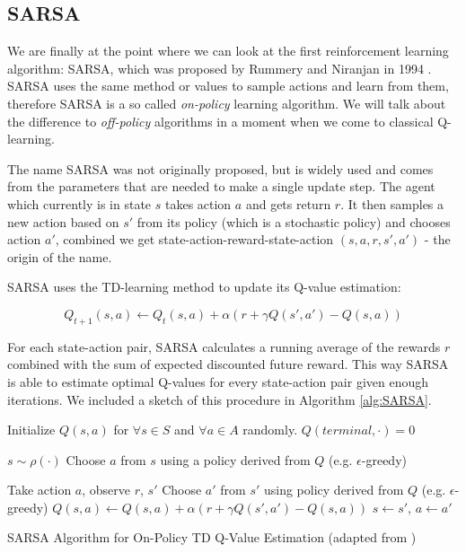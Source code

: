 \subsection{SARSA} \label{ssec:SARSA}
We are finally at the point where we can look at the first reinforcement learning algorithm: SARSA, which was proposed by Rummery and Niranjan in 1994 \cite{rummery1994line}. SARSA uses the same method or values to sample actions and learn from them, therefore SARSA is a so called \textit{on-policy} learning algorithm. We will talk about the difference to \textit{off-policy} algorithms in a moment when we come to classical Q-learning.

The name SARSA was not originally proposed, but is widely used and comes from the parameters that are needed to make a single update step. The agent which currently is in state $s$ takes action $a$ and gets return $r$. It then samples a new action based on $s'$ from its policy (which is a stochastic policy) and chooses action $a'$, combined we get  state-action-reward-state-action $(s, a, r, s', a')$ - the origin of the name.

SARSA uses the TD-learning method to update its Q-value estimation:

\[Q_{t+1}(s, a) \leftarrow Q_t(s, a) + \alpha (r + \gamma Q(s', a') - Q(s, a))\]

For each state-action pair, SARSA calculates a running average of the rewards $r$ combined with the sum of expected discounted future reward. This way SARSA is able to estimate optimal Q-values for every state-action pair given enough iterations. We included a sketch of this procedure in Algorithm \ref{alg:SARSA}.

\begin{algorithm}[ht]
  Initialize $Q(s, a)$ for $\forall s \in S$ and $\forall a \in A$ randomly. $Q(terminal, \cdot) = 0$ \;
   {
   $s \sim \rho(\cdot)$ \;
   Choose $a$ from $s$ using a policy derived from $Q$ (e.g. $\epsilon$-greedy) \;
   
     {
     Take action $a$, observe $r$, $s'$ \;
     Choose $a'$ from $s'$ using policy derived from $Q$ (e.g. $\epsilon$-greedy) \;
     $Q(s, a) \leftarrow Q(s, a) + \alpha (r + \gamma Q(s', a') - Q(s, a))$ \;
     $s \leftarrow s'$, $a \leftarrow a'$ \;
   }
 }
  \caption[The SARSA Algorithm]{SARSA Algorithm for On-Policy TD Q-Value Estimation (adapted from \cite{sutton2018reinforcement})}\label{alg:SARSA}
 \end{algorithm}

